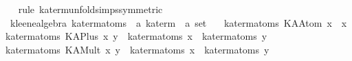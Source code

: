 \begin{isabellebody}
%
\isadelimproof
\ \ %
\endisadelimproof
%
\isatagproof
{}\isamarkupfalse%
\ {}rule\ ka{}term{}unfold{}simps{}{}{}{}symmetric{}{}%
\endisatagproof
{\isafoldproof}%
%
\isadelimproof
\isanewline
%
\endisadelimproof
\isanewline
{}\isamarkupfalse%
\ {}\ kleene{}algebra{}\ ka{}term{}atoms\ {}{}\ {}{}a\ ka{}term\ {}\ {}a\ set{}\ \isanewline
\ \ {}ka{}term{}atoms\ {}KAAtom\ x{}\ {}\ {}x{}{}\isanewline
{}\ {}ka{}term{}atoms\ {}KAPlus\ x\ y{}\ {}\ {}ka{}term{}atoms\ x{}\ {}\ {}ka{}term{}atoms\ y{}{}\isanewline
{}\ {}ka{}term{}atoms\ {}KAMult\ x\ y{}\ {}\ {}ka{}term{}atoms\ x{}\ {}\ {}ka{}term{}atoms\ y{}{}\isanewline

\end{isabellebody}
